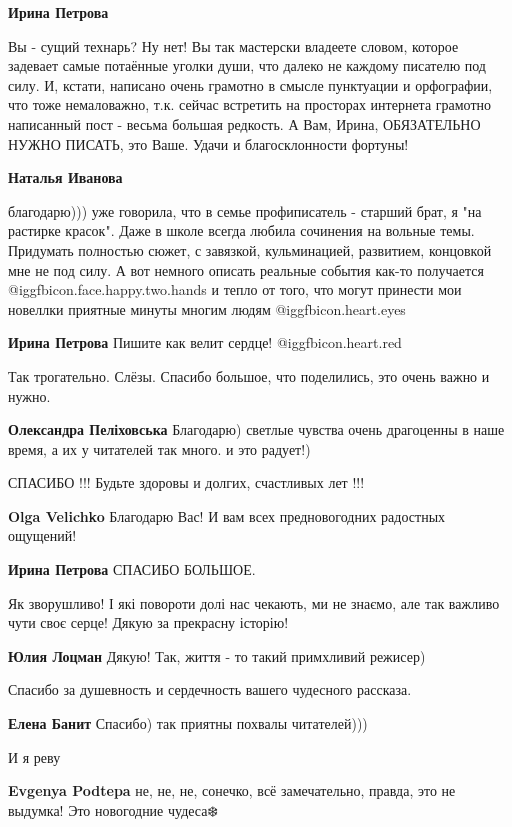 \begin{itemize}
\begin{itemize}
\textbf{Ирина Петрова}

Вы - сущий технарь? Ну нет! Вы так мастерски владеете словом, которое задевает
самые потаённые уголки души, что далеко не каждому писателю под силу. И,
кстати, написано очень грамотно в смысле пунктуации и орфографии, что тоже
немаловажно, т.к. сейчас встретить на просторах интернета грамотно написанный
пост - весьма большая редкость. А Вам, Ирина, ОБЯЗАТЕЛЬНО НУЖНО ПИСАТЬ, это
Ваше. Удачи и благосклонности фортуны!

\textbf{Наталья Иванова} 

благодарю))) уже говорила, что в семье профиписатель - старший брат, я "на
растирке красок". Даже в школе всегда любила сочинения на вольные темы.
Придумать полностью сюжет, с завязкой, кульминацией, развитием, концовкой мне
не под силу. А вот немного описать реальные события как-то получается @igg{fbicon.face.happy.two.hands}  и тепло
от того, что могут принести мои новеллки приятные минуты многим людям @igg{fbicon.heart.eyes} 

\textbf{Ирина Петрова} Пишите как велит сердце! @igg{fbicon.heart.red}

\end{itemize} %


Так трогательно. Слёзы.
Спасибо большое, что поделились, это очень важно и нужно.

\begin{itemize} %
\textbf{Олександра Пеліховська} Благодарю) светлые чувства очень драгоценны в наше время, а их у читателей так много. и это радует!)
\end{itemize} %

СПАСИБО !!! Будьте здоровы и долгих, счастливых лет !!!

\begin{itemize} %
\textbf{Olga Velichko} Благодарю Вас! И вам всех предновогодних радостных ощущений!

\textbf{Ирина Петрова} СПАСИБО БОЛЬШОЕ.
\end{itemize} %

Як зворушливо! І які повороти долі нас чекають, ми не знаємо, але так важливо чути своє серце! Дякую за прекрасну історію!

\textbf{Юлия Лоцман} Дякую! Так, життя - то такий примхливий режисер)

Спасибо за душевность и сердечность вашего чудесного рассказа.

\textbf{Елена Банит} Спасибо) так приятны похвалы читателей)))

И я реву

\begin{itemize} %
\textbf{Evgenya Podtepa} не, не, не, сонечко, всё замечательно, правда, это не выдумка! Это новогодние чудеса❄️
\end{itemize} %

\end{itemize} %
